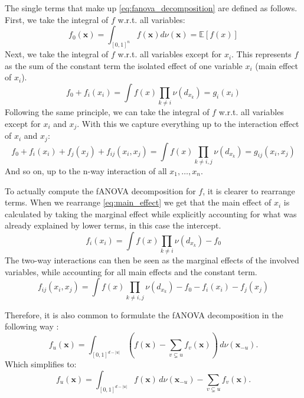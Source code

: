     
The single terms that make up \autoref{eq:fanova_decomposition} are defined as follows.
First, we take the integral of $f$ w.r.t. all variables:
\begin{equation}
    f_{0}(\mathbf{x}) = \int_{[0, 1]^n} f(\mathbf{x}) d\nu(\mathbf{x}) = \mathbb{E}[f(x)]
    \label{eq:intercapt}
\end{equation}
Next, we take the integral of $f$ w.r.t. all variables except for $x_i$. This represents $f$ as the sum of the constant term the isolated effect of one variable $x_i$ (main effect of $x_i$).
\begin{equation}
    f_0 + f_i(x_i) = \int f(x) \prod_{k \neq i} \nu (d_{x_{k}}) = g_i(x_i)
    \label{eq:main_effect}
\end{equation}
Following the same principle, we can take the integral of $f$ w.r.t. all variables except for $x_i$ and $x_j$. With this we capture everything up to the interaction effect of $x_i$ and $x_j$:
\begin{equation}
    f_0 + f_i(x_i) + f_j(x_j) + f_{ij}(x_i,x_j) = \int f(x) \prod_{k \neq i,j} \nu(d_{x_{k}}) = g_{ij}(x_i, x_j)
    \label{eq:interaction_effects}
\end{equation}
And so on, up to the n-way interaction of all $x_1, \dots, x_n$.\par

To actually compute the fANOVA decomposition for $f$, it is clearer to rearrange terms. When we rearrange \autoref{eq:main_effect} we get that the main effect of $x_i$ is calculated by taking the marginal effect while explicitly accounting for what was already explained by lower terms, in this case the intercept. 
\begin{equation}
    f_i(x_i) = \int f(x) \prod_{k \neq i} \nu(d_{x_{k}}) - f_0
    \label{eq:main_effect_rearranged}
\end{equation}
The two-way interactions can then be seen as the marginal effects of the involved variables, while accounting for all main effects and the constant term. 
\begin{equation}
    f_{ij}(x_i,x_j) = \int f(x) \prod_{k \neq i,j} \nu(d_{x_{k}}) - f_0 - f_i(x_i) - f_j(x_j) 
    \label{eq:interaction_effects}
\end{equation}

Therefore, it is also common to formulate the fANOVA decomposition in the following way \citep{hooker2007,hooker2004}:
\begin{equation}
    f_u(\mathbf{x}) = \int_{[0,1]^{d - |u|}} \left( f(\mathbf{x}) - \sum_{v \subsetneq u} f_v(\mathbf{x}) \right) \, d\nu(\mathbf{x}_{-u}).
\end{equation}
Which simplifies to:
\begin{equation}
    f_u(\mathbf{x}) = \int_{[0,1]^{d - |u|}} f(\mathbf{x}) \, d\nu(\mathbf{x}_{-u}) - \sum_{v \subsetneq u} f_v(\mathbf{x}).
\end{equation}

